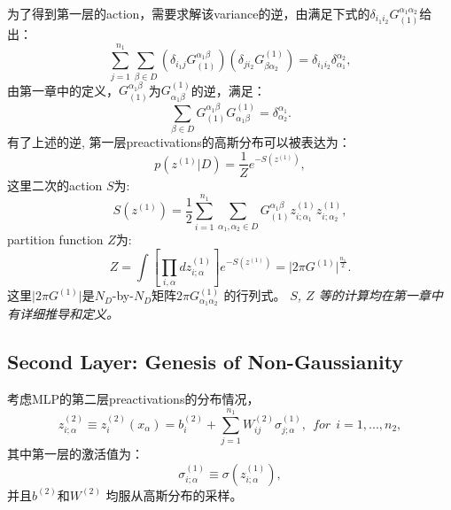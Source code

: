 为了得到第一层的action，需要求解该variance的逆，由满足下式的$\delta_{i_1i_2}G^{\alpha_1\alpha_2}_{(1)}$给出：
\begin{equation}
    \sum_{j=1}^{n_1} \sum_{\beta\in D} \left(\delta_{i_1j}G_{(1)}^{\alpha_1\beta}\right)
    \left(\delta_{ji_2}G^{(1)}_{\beta\alpha_2}\right) = \delta_{i_1i_2}\delta_{\alpha_1}^{\alpha_2},
\end{equation}
由第一章中的定义，$G_{(1)}^{\alpha_1\beta}$为$G^{(1)}_{\alpha_1\beta}$的逆，满足：
\begin{equation}
    \sum_{\beta\in D}G_{(1)}^{\alpha_1\beta}G^{(1)}_{\alpha_1\beta}=\delta^{\alpha_1}_{\alpha_2}.
\end{equation}
有了上述的逆, 第一层preactivations的高斯分布可以被表达为：
\begin{equation}
    p\left(z^{(1)}\bigg| D\right) = \frac{1}{Z}e^{-S(z^{(1)})},
    \label{eq:ch4_z1_p}
\end{equation}
这里二次的action $S$为:
\begin{equation}
    S(z^{(1)}) = \frac{1}{2}\sum_{i=1}^{n_1}\sum_{\alpha_1,\alpha_2\in D} 
        G_{(1)}^{\alpha_1\beta}z_{i;\alpha_1}^{(1)}z_{i;\alpha_2}^{(1)},
\end{equation}
partition function $Z$为:
\begin{equation}
    Z = \int \left[\prod_{i,\alpha} dz_{i;\alpha}^{(1)}\right]e^{-S(z^{(1)})}
        = \big|2\pi G^{(1)}\big|^{\frac{n_1}{2}}.
\end{equation}
这里$\big|2\pi G^{(1)}\big|$是$N_D$-by-$N_D$矩阵$2\pi G_{\alpha_1\alpha_2}^{(1)}$
的行列式。 \emph{$S$, $Z$ 等的计算均在第一章中有详细推导和定义。}

\subsection{Second Layer: Genesis of Non-Gaussianity}
考虑MLP的第二层preactivations的分布情况，
\begin{equation}
    z_{i;\alpha}^{(2)} \equiv z_{i}^{(2)}(x_\alpha) = b_i^{(2)} + \sum_{j=1}^{n_1}
        W_{ij}^{(2)}\sigma_{j;\alpha}^{(1)},~~ for ~~ i=1,...,n_2,
\end{equation}
其中第一层的激活值为：
\begin{equation}
    \sigma_{i;\alpha}^{(1)} \equiv \sigma(z_{i;\alpha}^{(1)}),
\end{equation}
并且$b^{(2)}$和$W^{(2)}$ 均服从高斯分布的采样。

